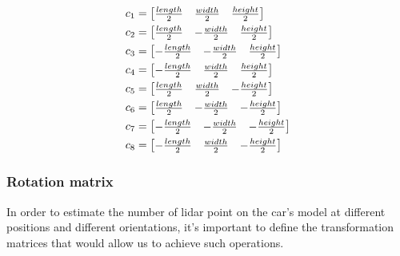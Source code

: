 \documentclass{scrartcl}
\begin{document}
    \begin{equation}
      \centering
      \begin{aligned}
        c_1 &= 
        \begin{bmatrix}
          \frac{length}{2} & \frac{width}{2} & \frac{height}{2}
        \end{bmatrix} \\
        c_2 &= 
        \begin{bmatrix}
          \frac{length}{2} & -\frac{width}{2} & \frac{height}{2}
        \end{bmatrix} \\
        c_3 &= 
        \begin{bmatrix}
          -\frac{length}{2} & -\frac{width}{2} & \frac{height}{2}
        \end{bmatrix} \\
        c_4 &= 
        \begin{bmatrix}
          -\frac{length}{2} & \frac{width}{2} & \frac{height}{2}
        \end{bmatrix} \\
        c_5 &= 
        \begin{bmatrix}
          \frac{length}{2} & \frac{width}{2} & -\frac{height}{2}
        \end{bmatrix} \\
        c_6 &= 
        \begin{bmatrix}
          \frac{length}{2} & -\frac{width}{2} & -\frac{height}{2}
        \end{bmatrix} \\
        c_7 &= 
        \begin{bmatrix}
          -\frac{length}{2} & -\frac{width}{2} & -\frac{height}{2}
        \end{bmatrix} \\
        c_8 &= 
        \begin{bmatrix}
          -\frac{length}{2} & \frac{width}{2} & -\frac{height}{2}
        \end{bmatrix}
      \end{aligned}
      \label{equation:corners-coordinates}
    \end{equation}

    \subsubsection{Rotation matrix}

    In order to estimate the number of lidar point on the car's model at
    different positions and different orientations, it's important to define
    the transformation matrices that would allow us to achieve such operations.
\end{document}
